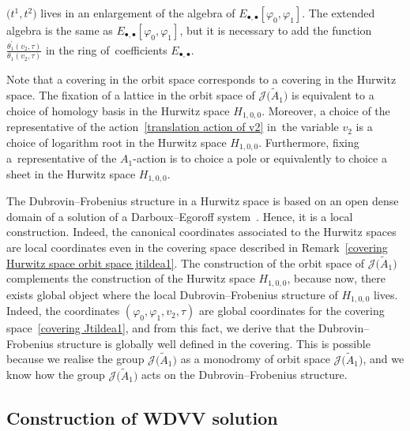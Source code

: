 \documentclass[10pt,a4paper]{amsart}
\numberwithin{equation}{section}
\newcommand{\Ja}{\mathcal{J}}
\begin{document}
\begin{Remark}
 $\big(t^1,t^2\big)$ lives in an enlargement of the algebra of $E_{\bullet,\bullet}[\varphi_0,\varphi_1]$. The extended algebra is the same as $E_{\bullet,\bullet}[\varphi_0,\varphi_1]$, but it is necessary to add the function $\frac{\theta_1^{\prime}(v_2,\tau)}{\theta_1(v_2,\tau)}$ in the ring of~coefficients $E_{\bullet,\bullet}$.
\end{Remark}

\begin{Remark}\label{covering Hurwitz space orbit space jtildea1}
Note that a covering in the orbit space corresponds to a covering in the Hurwitz space. The fixation of a lattice in the orbit space of $\Ja\big(\tilde A_1\big)$ is equivalent to a choice of homology basis in the Hurwitz space $H_{1,0,0}$. Moreover, a choice of the representative of the action~\eqref{translation action of v2} in~the variable $v_2$ is a choice of logarithm root in the Hurwitz space $H_{1,0,0}$. Furthermore, fixing a~representative of the $A_1$-action is to choice a pole or equivalently to choice a sheet in the Hurwitz space $H_{1,0,0}$.
\end{Remark}

\begin{Remark}
The Dubrovin--Frobenius structure in a Hurwitz space is based on an open dense domain of a solution of a Darboux--Egoroff system~\cite{B.Dubrovin2, V.Shramchenko}. Hence, it is a local construction. Indeed, the canonical coordinates associated to the Hurwitz spaces are local coordinates even in the covering space described in Remark~\ref{covering Hurwitz space orbit space jtildea1}. The construction of the orbit space of $\Ja\big(\tilde A_1\big)$ complements the construction of the Hurwitz space $H_{1,0,0}$, because now, there exists global object where the local Dubrovin--Frobenius structure of $H_{1,0,0}$ lives. Indeed, the coordinates $(\varphi_0,\varphi_1,v_2,\tau)$ are global coordinates for the covering space~\eqref{covering Jtildea1}, and from this fact, we derive that the Dubrovin--Frobenius structure is globally well defined in the covering. This is possible because we realise the group $\Ja\big(\tilde A_1\big)$ as a monodromy of orbit space $\Ja\big(\tilde A_1\big)$, and we know how the group $\Ja\big(\tilde A_1\big)$ acts on the Dubrovin--Frobenius structure.
\end{Remark}

\subsection{Construction of WDVV solution}\label{Construction of WDVV solution}
\end{document}

